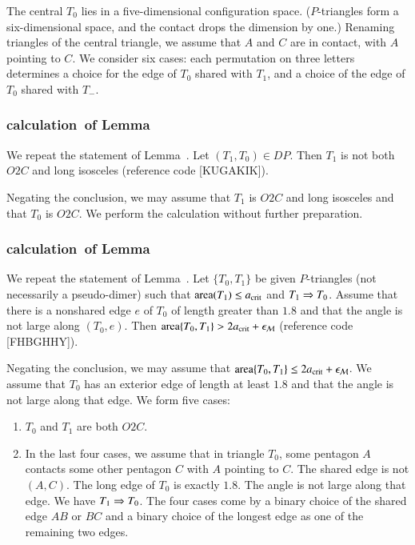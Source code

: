 The central $T_0$ lies in a five-dimensional configuration
space. ($P$-triangles form a six-dimensional space, and the contact
drops the dimension by one.)  Renaming triangles of the central
triangle, we assume that $A$ and $C$ are in contact, with $A$ pointing
to $C$.  We consider six cases: each permutation on three letters
determines a choice for the edge of $T_0$ shared with $T_1$, and a
choice of the edge of $T_0$ shared with $T_-$.

\subsubsection{calculation~of Lemma~}

We repeat the statement of Lemma~.  Let
$(T_1,T_0)\in DP$.  Then $T_1$ is not both $O2C$ and long isosceles
(reference code [KUGAKIK]).

Negating the conclusion, we may assume that $T_1$ is $O2C$ and long
isosceles and that $T_0$ is $O2C$.  We perform the calculation without
further preparation.

\subsubsection{calculation~of Lemma~} %

We repeat the statement of Lemma~.  Let $\{T_0,T_1\}$
be given $P$-triangles (not necessarily a pseudo-dimer) such that
${\operatorname{area}}(T_1)\le a_\text{crit}$ and $T_1\Rightarrow T_0$.  Assume that there is a
nonshared edge $e$ of $T_0$ of length greater than $1.8$ and that the
angle is not large along $(T_0,e)$.  Then ${\operatorname{area}}\{T_0,T_1\} > 2a_\text{crit}
+ \epsilon_{\mathcal M}$ (reference code [FHBGHHY]).

Negating the conclusion, we may assume that ${\operatorname{area}}\{T_0,T_1\}\le
2a_\text{crit} + \epsilon_{\mathcal M}$.  We assume that $T_0$ has an exterior edge of length
at least $1.8$ and that the angle is not large along that edge.  We
form five cases:
\begin{enumerate}  
\item $T_0$ and $T_1$ are both $O2C$.
\item In the last four cases, we assume that in triangle $T_0$, some
  pentagon $A$ contacts some other pentagon $C$ with $A$ pointing to
  $C$.  The shared edge is not $(A,C)$. The long edge of $T_0$ is
  exactly $1.8$.  The angle is not large along that edge.  We have
  $T_1\Rightarrow T_0$.  The four cases come by a binary choice of the shared
  edge $AB$ or $BC$ and a binary choice of the longest edge as one of
  the remaining two edges.
\end{enumerate}

